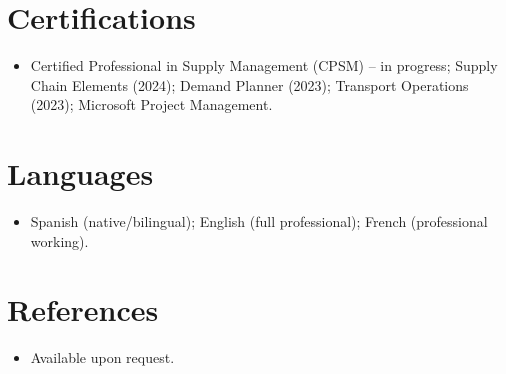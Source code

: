 \documentclass[11pt,a4paper,sans]{moderncv}
\begin{document}
\section{Certifications}
\vspace{1pt}
\begin{itemize}
\item Certified Professional in Supply Management (CPSM) -- in progress; Supply Chain Elements (2024); Demand Planner (2023); Transport Operations (2023); Microsoft Project Management.
\end{itemize}


\section{Languages}
\vspace{1pt}
\begin{itemize}
\item Spanish (native/bilingual); English (full professional); French (professional working).
\end{itemize}


\section{References}
\vspace{1pt}
\begin{itemize}
\item{Available upon request.}
\end{itemize}
\end{document}
